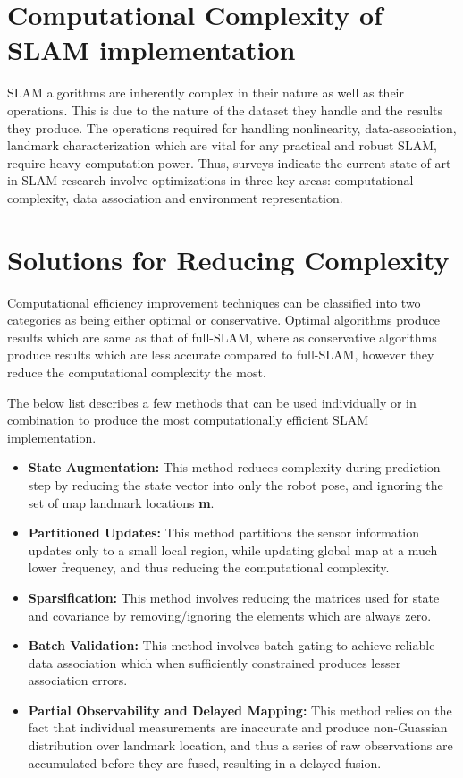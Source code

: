 \documentclass[conference]{IEEEtran}
\begin{document}
\section {Computational Complexity of SLAM implementation}
SLAM algorithms are inherently complex in their nature as well as their operations. This is due to the nature of the dataset they handle and the results they produce. The operations required for handling nonlinearity, data-association, landmark characterization which are vital for any practical and robust SLAM, require heavy computation power. Thus, surveys indicate the current state of art in SLAM research involve optimizations in three key areas: computational complexity, data association and environment representation.

\section {Solutions for Reducing Complexity}
Computational efficiency improvement techniques can be classified into two categories as being either optimal or conservative. Optimal algorithms produce results which are same as that of full-SLAM, where as conservative algorithms produce results which are less accurate compared to full-SLAM, however they reduce the computational complexity the most.

\par The below list describes a few methods that can be used individually or in combination to produce the most computationally efficient SLAM implementation.

\begin{itemize}
	\item \textbf{State Augmentation:} This method reduces complexity during prediction step by reducing the state vector into only the robot pose, and ignoring the set of map landmark locations \textbf{m}.
    \item \textbf{Partitioned Updates:} This method partitions the sensor information updates only to a small local region, while updating global map at a much lower frequency, and thus reducing the computational complexity.
    \item \textbf{Sparsification:} This method involves reducing the matrices used for state and covariance by removing/ignoring the elements which are always zero.
    \item \textbf{Batch Validation:} This method involves batch gating to achieve reliable data association which when sufficiently constrained produces lesser association errors.
    \item \textbf{Partial Observability and Delayed Mapping:} This method relies on the fact that individual measurements are inaccurate and produce non-Guassian distribution over landmark location, and thus a series of raw observations are accumulated before they are fused, resulting in a delayed fusion.
\end{itemize}
    
\end{document}

